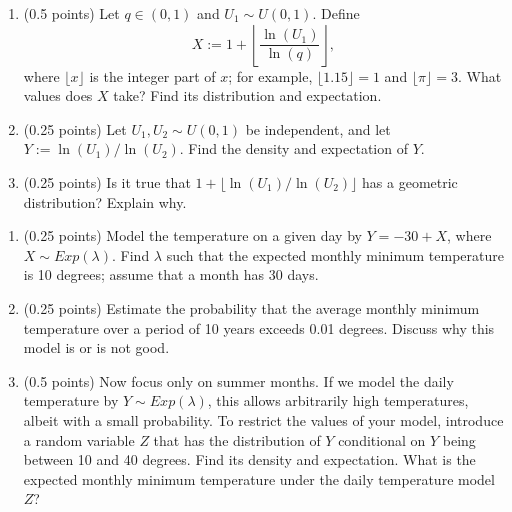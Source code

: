 \documentclass[a4paper]{report}
\begin{document}
\begin{problem}
\begin{enumerate}
\item (0.5 points) Let $q\in(0,1)$ and $U_1\sim U(0,1)$. Define
\[X:=1+\left\lfloor\frac{\ln(U_1)}{\ln(q)}\right\rfloor,\]
where $\lfloor x\rfloor$ is the integer part of $x$; for example, $\lfloor1.15\rfloor=1$ and $\lfloor\pi\rfloor=3$. What values does $X$ take? Find its distribution and expectation.
\item (0.25 points) Let $U_1,U_2\sim U(0,1)$ be independent, and let $Y:=\ln(U_1)/\ln(U_2)$. Find the density and expectation of $Y$.
\item (0.25 points) Is it true that $1+\lfloor\ln(U_1)/\ln(U_2)\rfloor$ has a geometric distribution? Explain why.
\end{enumerate}
\end{problem}
\begin{problem}
\begin{enumerate}
\item (0.25 points) Model the temperature on a given day by $Y=-30+X$, where $X\sim Exp(\lambda)$. Find $\lambda$ such that the expected monthly minimum temperature is 10 degrees; assume that a month has 30 days.
\item (0.25 points) Estimate the probability that the average monthly minimum temperature over a period of 10 years exceeds 0.01 degrees. Discuss why this model is or is not good.
\item (0.5 points) Now focus only on summer months. If we model the daily temperature by $Y\sim Exp(\lambda)$, this allows arbitrarily high temperatures, albeit with a small probability. To restrict the values of your model, introduce a random variable $Z$ that has the distribution of $Y$ conditional on $Y$ being between 10 and 40 degrees. Find its density and expectation. What is the expected monthly minimum temperature under the daily temperature model $Z$?
\end{enumerate}
\end{problem}
\end{document}
